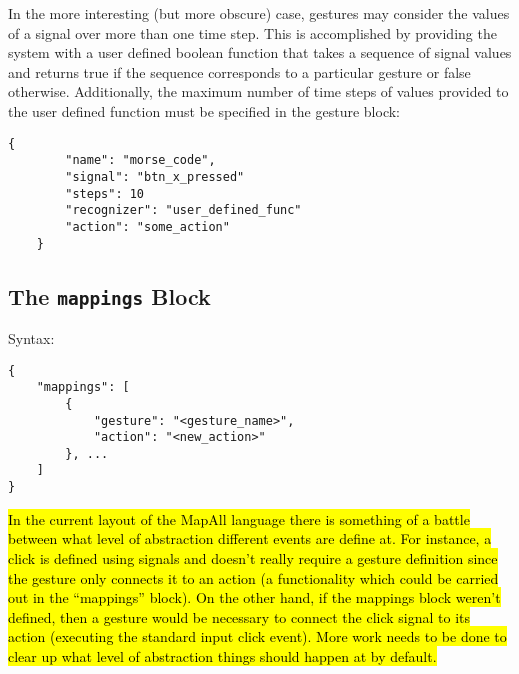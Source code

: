 \documentclass{article}
\begin{document}
In the more interesting (but more obscure) case, gestures may consider the values of a signal over more than one time step.
This is accomplished by providing the system with a user defined boolean function that takes a sequence of signal values and returns true if the sequence corresponds to a particular gesture or false otherwise. Additionally, the maximum number of time steps of values provided to the user defined function must be specified in the gesture block:

\begin{Verbatim}[baselinestretch=1.0]
    {
        "name": "morse_code",
        "signal": "btn_x_pressed"
        "steps": 10
        "recognizer": "user_defined_func"
        "action": "some_action"
    }
\end{Verbatim}

\subsection{The \texttt{mappings} Block}
Syntax:

\begin{Verbatim}[baselinestretch=1.0]
{
    "mappings": [
        {
            "gesture": "<gesture_name>",
            "action": "<new_action>"
        }, ...
    ]
}
\end{Verbatim}

\hl{In the current layout of the MapAll language there is something of a battle between what level of abstraction different events are define at.
For instance, a click is defined using signals and doesn't really require a gesture definition since the gesture only connects it to an action (a functionality which could be carried out in the ``mappings'' block). On the other hand, if the mappings block weren't defined, then a gesture would be necessary to connect the click signal to its action (executing the standard input click event). More work needs to be done to clear up what level of abstraction things should happen at by default.}


 
\end{document}
